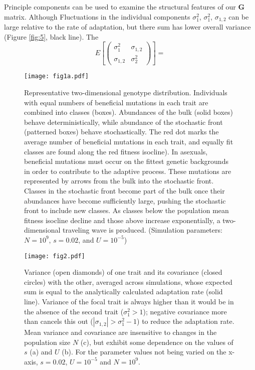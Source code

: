 \documentclass[9pt,twocolumn,twoside]{gsajnl}
\newcommand{\G}{\textbf{G }}
\begin{document}
Principle components can be used to examine the structural features of our \G matrix. Although Fluctuations in the individual components $\sigma_1^2$, $\sigma_1^2$, $\sigma_{1,2}$ can be large relative to the rate of adaptation, but there sum has lower overall variance (Figure \ref{fig:5}, black line). The  
\[
E\left[
\left( \begin{array}{cc}
\sigma_1^2 & \sigma_{1,2} \\
\sigma_{1,2} & \sigma_2^2 
\end{array}\right)
\right] = 
\]

\begin{figure}[!ht]
\texttt{[image: fig1a.pdf]}
\caption{Representative two-dimensional genotype distribution. Individuals with equal numbers of beneficial mutations in each trait are combined into classes (boxes). Abundances of the bulk (solid boxes) behave deterministically, while abundance of the stochastic front (patterned boxes) behave stochastically. The red dot marks the average number of beneficial mutations in each trait, and equally fit classes are found along the red fitness isocline). In asexuals, beneficial mutations must occur on the fittest genetic backgrounds in order to contribute to the adaptive process. These mutations are represented by arrows from the bulk into the stochastic front. Classes in the stochastic front become part of the bulk once their abundances have become sufficiently large, pushing the stochastic front to include new classes. As classes below the population mean fitness isocline decline and those above increase exponentially, a two-dimensional traveling wave is produced. (Simulation parameters: $N=10^9$, $s=0.02$, and $U=10^{-5}$)}\label{fig:1}
\end{figure}

\begin{figure*}[!ht]
\centering
\texttt{[image: fig2.pdf]} 
\caption{Variance (open diamonds) of one trait and its covariance (closed circles) with the other, averaged across simulations, whose expected sum is equal to the analytically calculated adaptation rate (solid line). Variance of the focal trait is always higher than it would be in the absence of the second trait ($\sigma_1^2 >1$); negative covariance more than cancels this out ($|\sigma_{1,2}| > \sigma_1^2-1$) to reduce the adaptation rate.  Mean variance and covariance are insensitive to changes in the population size $N$ (c), but exhibit some dependence on the values of $s$ (a) and $U$ (b). For the parameter values not being varied on the x-axis, $s=0.02$, $U=10^{-5}$ and $N=10^9$. }\label{fig:2}
% 
% 
\end{figure*}
\end{document}
